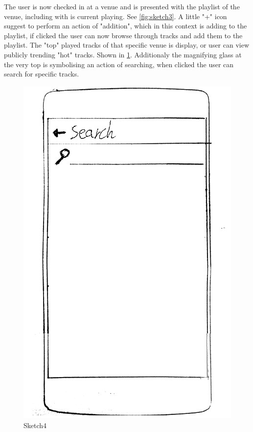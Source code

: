 The user is now checked in at a venue and is presented with the playlist of the venue, including with is current playing. See \cref{fig:sketch3}. A little "+" icon suggest to perform an action of "addition", which in this context is adding to the playlist, if clicked the user can now browse through tracks and add them to the playlist. The "top" played tracks of that specific venue is display, or user can view publicly trending "hot" tracks. Shown in \cref{fig:sketch4}. Additionaly the magnifying glass at the very top is symbolising an action of searching, when clicked the user can search for specific tracks.

\begin{figure}
  \centering
  \includegraphics[width=0.25\linewidth]{Images/sketch4.png}
  \caption{Sketch4}
  \label{fig:sketch4}
\end{figure}
